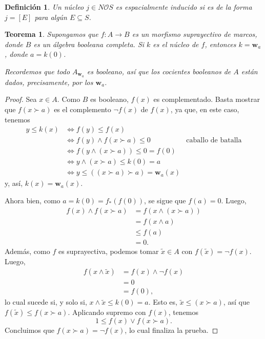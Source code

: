 \documentclass[12pt,letterpaper,titlepage]{article}
\newtheorem*{defn}{Definición}
\newtheorem{thm}{Teorema}
\theoremstyle{definition}
\renewcommand\sup{\vee}
\renewcommand\inf{\wedge}
\renewcommand\cal[1]{\mathcal{#1}}
\newcommand\wnuc[1]{\mathbf w_{#1}}
\newcommand\<{\langle}
\renewcommand\>{\rangle}
\begin{document}
\begin{defn}
  Un núcleo $j\in N\cal O S$ es \emph{espacialmente
  inducido} si es de la forma $j=[E]$ para algún
  $E\subseteq S$.
\end{defn}

\begin{thm}
  Supongamos que $f:A\to B$ es un morfismo suprayectivo de marcos,
  donde $B$ es un álgebra booleana completa.
  Si $k$ es el núcleo de $f$, entonces $k=\wnuc a$, donde $a=k(0)$.
  
  Recordemos que todo $A_{\wnuc a}$ es booleano, así que los
  cocientes booleanos de $A$ están dados, precisamente,
  por los $\wnuc a$.
\end{thm}
\begin{proof}
    Sea $x\in A$. Como $B$ es booleano, $f(x)$ es complementado.
    Basta mostrar que $f(x\succ a)$ es el complemento $\neg f(x)$
    de $f(x)$, ya que, en este caso, tenemos
    \begin{align*}
        y\leq k(x)
        &\iff f(y) \leq f(x) \\
        &\iff f(y) \inf f(x\succ a) \leq 0
            & \text{caballo de batalla} \\
        &\iff f(y\inf(x\succ a)) \leq 0 = f(0) \\
        &\iff y\inf(x\succ a) \leq k(0) = a \\
        &\iff y\leq ((x\succ a)\succ a) = \wnuc a(x)
    \end{align*}
    y, así, $k(x)=\wnuc a(x)$.
    
    Ahora bien, como $a=k(0)=f_*(f(0))$, se sigue que $f(a)=0$.
    Luego,
    \begin{align*}
        f(x)\inf f(x\succ a)
        &= f(x\inf(x\succ a)) \\
        &= f(x\inf a) \\
        &\leq f(a) \\
        &= 0.
    \end{align*}
    Además, como $f$ es suprayectiva, podemos tomar
    $\tilde x\in A$ con $f(\tilde x)=\neg f(x)$.
    Luego,
    \begin{align*}
        f(x\inf \tilde x)
        &= f(x)\inf\neg f(x) \\
        &= 0 \\
        &= f(0),
    \end{align*}
    lo cual sucede si, y solo si, $x\inf \tilde x\leq k(0)=a$.
    Esto es, $\tilde x\leq(x\succ a)$, así que
    $f(\tilde x)\leq f(x\succ a)$.
    Aplicando supremo con $f(x)$, tenemos
    \[
        1\leq f(x)\sup f(x\succ a)
    .\]
    Concluimos que $f(x\succ a)=\neg f(x)$, lo cual finaliza la prueba.
\end{proof}
\end{document}
